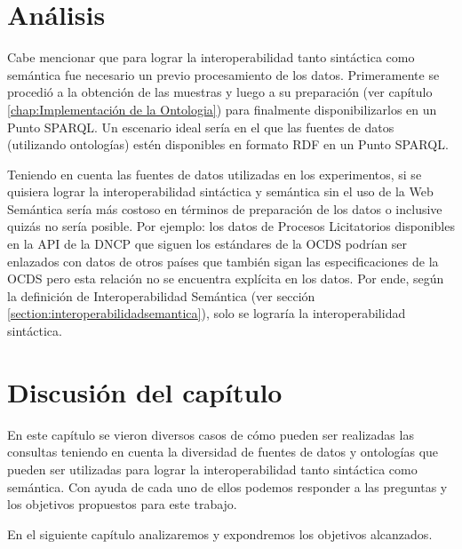 \section{Análisis}
Cabe mencionar que para lograr la interoperabilidad tanto sintáctica como semántica fue necesario un previo procesamiento de los datos. Primeramente se procedió a la obtención de las muestras y luego a su preparación (ver capítulo \ref{chap:Implementación de la Ontologia}) para finalmente disponibilizarlos en un Punto SPARQL. Un escenario ideal sería en el que las fuentes de datos (utilizando ontologías) estén disponibles en formato RDF en un Punto SPARQL.

Teniendo en cuenta las fuentes de datos utilizadas en los experimentos, si se quisiera lograr la interoperabilidad sintáctica y semántica sin el uso de la Web Semántica sería más costoso en términos de preparación de los datos o inclusive quizás no sería posible. Por ejemplo: los datos de Procesos Licitatorios disponibles en la API de la DNCP que siguen los estándares de la OCDS podrían ser enlazados con datos de otros países que también sigan las especificaciones de la OCDS pero esta relación no se encuentra explícita en los datos. Por ende, según la definición de Interoperabilidad Semántica (ver sección \ref{section:interoperabilidadsemantica}), solo se lograría la interoperabilidad sintáctica.

\section{Discusión del capítulo}

En este capítulo se vieron diversos casos de cómo pueden ser realizadas las consultas teniendo en cuenta la diversidad de fuentes de datos y ontologías que pueden ser utilizadas para lograr la interoperabilidad tanto sintáctica como semántica. Con ayuda de cada uno de ellos podemos responder a las preguntas y los objetivos propuestos para este trabajo.
 
En el siguiente capítulo analizaremos y expondremos los objetivos alcanzados.


